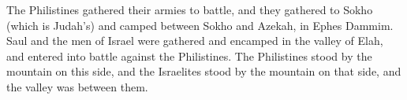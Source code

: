 
\begin{inparaenum}
     The Philistines gathered their armies to battle, and they gathered to Sokho (which is Judah's) and camped between Sokho and Azekah, in Ephes Dammim.%
     Saul and the men of Israel were gathered and encamped in the valley of Elah, and entered into battle against the Philistines.%
     The Philistines stood by the mountain on this side, and the Israelites stood by the mountain on that side, and the valley was between them.%
    
    
    
    
    
    
    
    
    
\end{inparaenum}
